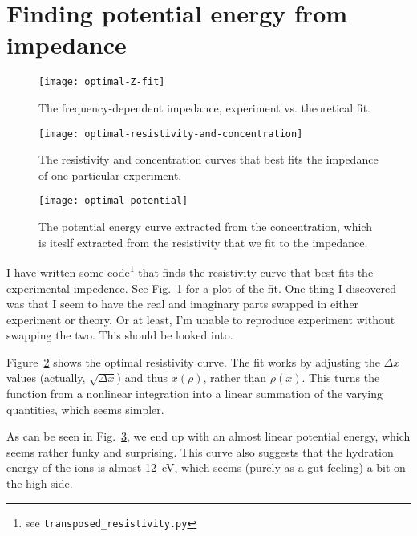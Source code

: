 \documentclass[twocolumn]{article}
\begin{document}
\clearpage

\section{Finding potential energy from impedance}

\begin{figure}
  \texttt{[image: optimal-Z-fit]}
  \caption{The frequency-dependent impedance, experiment
    vs. theoretical fit.}\label{fig:optimal-Z-fit}
\end{figure}

\begin{figure}
  \texttt{[image: optimal-resistivity-and-concentration]}
  \caption{The resistivity and concentration curves that best fits the
    impedance of one particular
    experiment.}\label{fig:optimal-resistivity-and-concentration}
\end{figure}

\begin{figure}
  \texttt{[image: optimal-potential]}
  \caption{The potential energy curve extracted from the
    concentration, which is iteslf extracted from the resistivity that
    we fit to the impedance.}\label{fig:optimal-potential}
\end{figure}

I have written some code\footnote{see \texttt{transposed\_resistivity.py}} that
finds the resistivity curve that best fits the experimental
impedence.  See Fig.~\ref{fig:optimal-Z-fit} for a plot of the fit.
One thing I discovered was that I seem to have the real and imaginary
parts swapped in either experiment or theory.  Or at least, I'm unable
to reproduce experiment without swapping the two.  This should be
looked into.

Figure~\ref{fig:optimal-resistivity-and-concentration} shows the
optimal resistivity curve.  The fit works by adjusting the $\Delta x$
values (actually, $\sqrt{\Delta x}$) and thus $x(\rho)$, rather than
$\rho(x)$.  This turns the function from a nonlinear integration into
a linear summation of the varying quantities, which seems simpler.

As can be seen in Fig.~\ref{fig:optimal-potential}, we end up with an
almost linear potential energy, which seems rather funky and
surprising.  This curve also suggests that the hydration energy of the
ions is almost 12~eV, which seems (purely as a gut feeling) a bit on
the high side.

\clearpage
\end{document}

